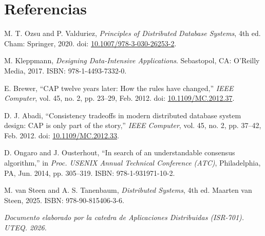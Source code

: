 \documentclass[11pt,a4paper]{article}
\begin{document}
\section{Referencias}

\begin{enumerate}[label={[\arabic*]}]
\item M. T. Ozsu and P. Valduriez, \textit{Principles of Distributed Database Systems}, 4th ed. Cham: Springer, 2020. doi: \href{https://doi.org/10.1007/978-3-030-26253-2}{10.1007/978-3-030-26253-2}.

\item M. Kleppmann, \textit{Designing Data-Intensive Applications}. Sebastopol, CA: O'Reilly Media, 2017. ISBN: 978-1-4493-7332-0.

\item E. Brewer, ``CAP twelve years later: How the rules have changed,'' \textit{IEEE Computer}, vol. 45, no. 2, pp. 23--29, Feb. 2012. doi: \href{https://doi.org/10.1109/MC.2012.37}{10.1109/MC.2012.37}.

\item D. J. Abadi, ``Consistency tradeoffs in modern distributed database system design: CAP is only part of the story,'' \textit{IEEE Computer}, vol. 45, no. 2, pp. 37--42, Feb. 2012. doi: \href{https://doi.org/10.1109/MC.2012.33}{10.1109/MC.2012.33}.

\item D. Ongaro and J. Ousterhout, ``In search of an understandable consensus algorithm,'' in \textit{Proc. USENIX Annual Technical Conference (ATC)}, Philadelphia, PA, Jun. 2014, pp. 305--319. ISBN: 978-1-931971-10-2.

\item M. van Steen and A. S. Tanenbaum, \textit{Distributed Systems}, 4th ed. Maarten van Steen, 2025. ISBN: 978-90-815406-3-6.

\end{enumerate}

\vspace{1cm}
\begin{center}
\color{uteqGray}\itshape\small Documento elaborado por la catedra de Aplicaciones Distribuidas (ISR-701). UTEQ. 2026.
\end{center}
\end{document}
